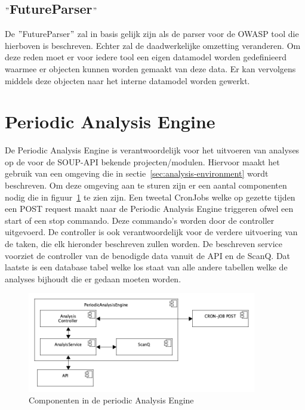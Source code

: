 \subsection{$"$FutureParser$"$}\label{subsec:$"$[future]parser$"$}
De $"$FutureParser$"$ zal in basis gelijk zijn als de parser voor de OWASP tool die hierboven is beschreven. Echter zal de daadwerkelijke omzetting veranderen. Om deze reden moet er voor iedere tool een eigen datamodel worden gedefinieerd waarmee er objecten kunnen worden gemaakt van deze data. Er kan vervolgens middels deze objecten naar het interne datamodel worden gewerkt.
\clearpage


\section{Periodic Analysis Engine}\label{sec:periodiek-analysis-engine}
De Periodic Analysis Engine is verantwoordelijk voor het uitvoeren van analyses op de voor de SOUP-API bekende projecten/modulen. Hiervoor maakt het gebruik van een omgeving die in sectie~\ref{sec:analysis-environment} wordt beschreven. Om deze omgeving aan te sturen zijn er een aantal componenten nodig die in figuur~\ref{fig:paeComps} te zien zijn. Een tweetal CronJobs welke op gezette tijden een POST request maakt naar de Periodic Analysis Engine triggeren ofwel een start of een stop commando. Deze commando's worden door de controller uitgevoerd. De controller is ook verantwoordelijk voor de verdere uitvoering van de taken, die elk hieronder beschreven zullen worden. De beschreven service voorziet de controller van de benodigde data vanuit de API en de ScanQ. Dat laatste is een database tabel welke los staat van alle andere tabellen welke de analyses bijhoudt die er gedaan moeten worden.
\begin{figure}[bth]
    \myfloatalign
    \includegraphics[width=10cm]{gfx/umlet/exports/PeriodicAnalyisEngineComponents}
    \caption{Componenten in de periodic Analysis Engine}
    \label{fig:paeComps}
\end{figure}
